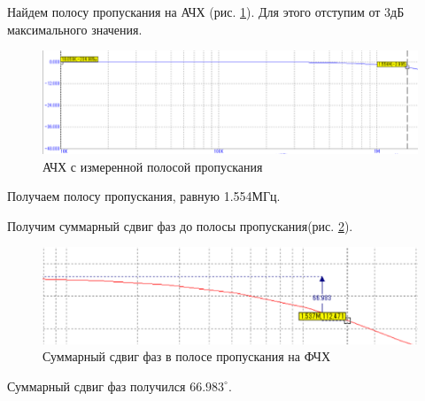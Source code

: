 \documentclass[a4paper,14pt]{article}
\begin{document}
Найдем полосу пропускания на АЧХ (рис. \ref{fig:achh}). Для этого отступим от 3дБ максимального значения. 

\begin{figure}[H]
	\centering
	\includegraphics[width=0.7\linewidth]{image/ACHH}
	\caption{АЧХ с измеренной полосой пропускания}
	\label{fig:achh}
\end{figure}

Получаем полосу пропускания, равную 1.554МГц.

Получим суммарный сдвиг фаз до полосы пропускания(рис. \ref{fig:afh}).

\begin{figure}[H]
	\centering
	\includegraphics[width=0.7\linewidth]{image/AFH}
	\caption{Суммарный сдвиг фаз в полосе пропускания на ФЧХ}
	\label{fig:afh}
\end{figure}

Суммарный сдвиг фаз получился $66.983^{\circ}$.
\end{document}

